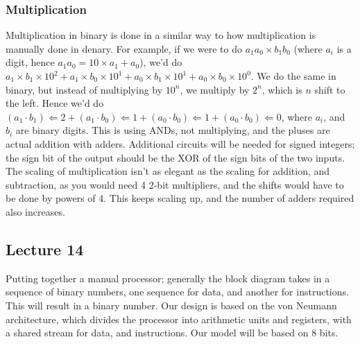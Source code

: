 \documentclass[a4paper, 12pt]{article}
\begin{document}
            \subsubsection*{Multiplication}
                Multiplication in binary is done in a similar way to how multiplication is manually done in denary. For example, if we were to do $a_1a_0 \times b_1b_0$ (where $a_i$ is a digit, hence $a_1a_0 = 10 \times a_1 + a_0$), we'd do $a_1 \times b_1 \times 10^2 + a_1 \times b_0 \times 10^1 + a_0 \times b_1 \times 10^1 + a_0 \times b_0 \times 10^0$. We do the same in binary, but instead of multiplying by $10^n$, we multiply by $2^n$, which is $n$ shift to the left. Hence we'd do $(a_1 \cdot b_1) \Leftarrow 2 + (a_1 \cdot b_0) \Leftarrow 1 + (a_0 \cdot b_0) \Leftarrow 1 + (a_0 \cdot b_0) \Leftarrow 0$, where $a_i$, and $b_i$ are binary digits. This is using ANDs, not multiplying, and the pluses are actual addition with adders. Additional circuits will be needed for signed integers; the sign bit of the output should be the XOR of the sign bits of the two inputs. The scaling of multiplication isn't as elegant as the scaling for addition, and subtraction, as you would need 4 2-bit multipliers, and the shifts would have to be done by powers of 4. This keeps scaling up, and the number of adders required also increases.
        \subsection*{Lecture 14}
            Putting together a manual processor; generally the block diagram takes in a sequence of binary numbers, one sequence for data, and another for instructions. This will result in a binary number. Our design is based on the von Neumann architecture, which divides the processor into arithmetic units and registers, with a shared stream for data, and instructions. Our model will be based on 8 bits.
            \medskip
\end{document}
